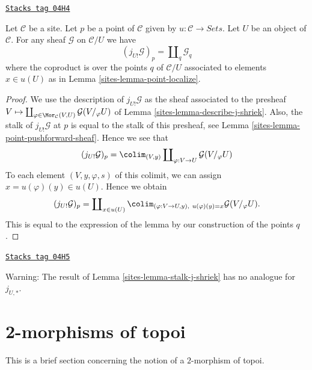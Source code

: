 \begin{lemma}
\label{sites-lemma-stalk-j-shriek}
\href{https://stacks.math.columbia.edu/tag/04H4}{\texttt{Stacks tag 04H4}}

Let $\mathcal{C}$ be a site. Let $p$ be a point of $\mathcal{C}$ given by
$u : \mathcal{C} \to \textit{Sets}$. Let $U$ be an object of $\mathcal{C}$.
For any sheaf $\mathcal{G}$ on $\mathcal{C}/U$ we have
$$
(j_{U!}\mathcal{G})_p =
\coprod\nolimits_q \mathcal{G}_q
$$
where the coproduct is over the points $q$ of $\mathcal{C}/U$
associated to elements $x \in u(U)$ as in
Lemma \ref{sites-lemma-point-localize}.
\end{lemma}

\begin{proof}

We use the description of $j_{U!}\mathcal{G}$ as the sheaf associated
to the presheaf
$V \mapsto
\coprod\nolimits_{\varphi \in \Mor_\mathcal{C}(V, U)}
\mathcal{G}(V/_\varphi U)$
of
Lemma \ref{sites-lemma-describe-j-shriek}.
Also, the stalk of $j_{U!}\mathcal{G}$ at $p$ is equal to the
stalk of this presheaf, see
Lemma \ref{sites-lemma-point-pushforward-sheaf}.
Hence we see that
$$
(j_{U!}\mathcal{G})_p =
\colim_{(V, y)} \coprod\nolimits_{\varphi : V \to U} \mathcal{G}(V/_\varphi U)
$$
To each element $(V, y, \varphi, s)$ of this colimit, we can assign
$x = u(\varphi)(y) \in u(U)$. Hence we obtain
$$
(j_{U!}\mathcal{G})_p =
\coprod\nolimits_{x \in u(U)}
\colim_{(\varphi : V \to U, y), \ u(\varphi)(y) = x} \mathcal{G}(V/_\varphi U).
$$
This is equal to the expression of the lemma by our
construction of the points $q$.
\end{proof}

\begin{remark}
\label{sites-remark-not-pushforward}
\href{https://stacks.math.columbia.edu/tag/04H5}{\texttt{Stacks tag 04H5}}

Warning: The result of
Lemma \ref{sites-lemma-stalk-j-shriek}
has no analogue for $j_{U, *}$.
\end{remark}

\section{2-morphisms of topoi}
\label{sites-section-2-category}
This is a brief section concerning the notion of a $2$-morphism
of topoi.

